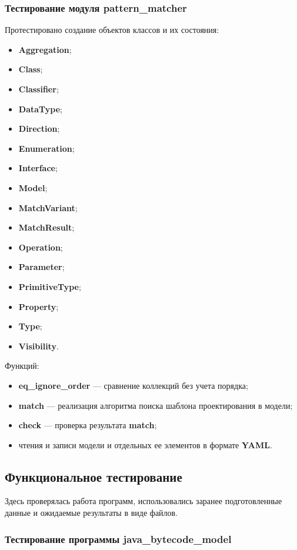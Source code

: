\subsubsection{Тестирование модуля pattern\_matcher}

Протестировано создание объектов классов и их состояния:
\begin{itemize}
\item \textbf{Aggregation};
\item \textbf{Class};
\item \textbf{Classifier};
\item \textbf{DataType};
\item \textbf{Direction};
\item \textbf{Enumeration};
\item \textbf{Interface};
\item \textbf{Model};
\item \textbf{MatchVariant};
\item \textbf{MatchResult};
\item \textbf{Operation};
\item \textbf{Parameter};
\item \textbf{PrimitiveType};
\item \textbf{Property};
\item \textbf{Type};
\item \textbf{Visibility}.
\end{itemize}

Функций:
\begin{itemize}
\item \textbf{eq\_ignore\_order} --- сравнение коллекций без учета порядка;
\item \textbf{match} --- реализация алгоритма поиска шаблона проектирования в модели;
\item \textbf{check} --- проверка результата \textbf{match};
\item чтения и записи модели и отдельных ее элементов в формате \textbf{YAML}.
\end{itemize}

\subsection{Функциональное тестирование}

Здесь проверялась работа программ, использовались заранее подготовленные данные
и ожидаемые результаты в виде файлов.

\subsubsection{Тестирование программы java\_bytecode\_model}

